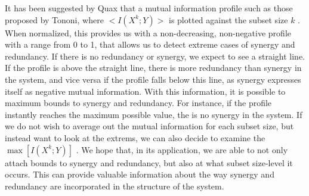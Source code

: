 \documentclass[../main.tex]{subfiles}
\begin{document}
It has been suggested by Quax that a mutual information profile such as those proposed by Tononi, where $< I(X^k;Y) >$ is plotted against the subset size $k$ \cite{QuaxPersonal,tononi1999measures}. 
When normalized, this provides us with a non-decreasing, non-negative profile with a range from 0 to 1, that allows us to detect extreme cases of synergy and redundancy.
If there is no redundancy or synergy, we expect to see a straight line.
If the profile is above the straight line, there is more redundancy than synergy in the system, and vice versa if the profile falls below this line, as synergy expresses itself as negative mutual information.
With this information, it is possible to maximum bounds to synergy and redundancy.
For instance, if the profile instantly reaches the maximum possible value, the is no synergy in the system.
If we do not wish to average out the mutual information for each subset size, but instead want to look at the extrems, we can also decide to examine the $\max [ I(X^k;Y) ]$ .
We hope that, in its application, we are able to not only attach bounds to synergy and redundancy, but also at what subset size-level it occurs.
This can provide valuable information about the way synergy and redundancy are incorporated in the structure of the system.

\end{document}
